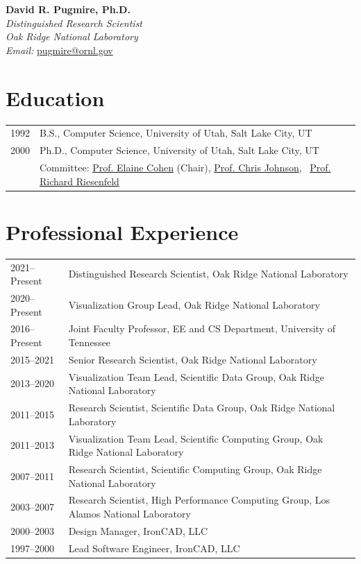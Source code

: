 \documentclass[11pt]{article}
\begin{document}
{\LARGE \textbf{David R. Pugmire, Ph.D.}}\\[0.5em]
\textit{Distinguished Research Scientist}\\
\textit{Oak Ridge National Laboratory}\\[0.5em]
\textit{Email:} \href{pugmire@ornl.gov}{pugmire@ornl.gov} \\
\vspace{1em}

\section*{Education}

\begin{tabular}{@{}p{2.5cm}p{11cm}@{}}
1992 & B.S., Computer Science, University of Utah, Salt Lake City, UT \\
2000 & Ph.D., Computer Science, University of Utah, Salt Lake City, UT \\
     & Committee: \href{https://profiles.faculty.utah.edu/u0028572}{Prof. Elaine Cohen} (Chair),
       \href{https://users.cs.utah.edu/~crj/}{Prof. Chris Johnson},%
       \ \href{https://users.cs.utah.edu/~rfr/}{Prof. Richard Riesenfeld} \\[0.5em]
\end{tabular}

\vspace{1em}

\section*{Professional Experience}

\begin{tabular}{@{}p{2.5cm}p{11cm}@{}}
2021--Present & Distinguished Research Scientist, Oak Ridge National Laboratory \\
2020--Present & Visualization Group Lead, Oak Ridge National Laboratory \\
2016--Present & Joint Faculty Professor, EE and CS Department, University of Tennessee \\
2015--2021    & Senior Research Scientist, Oak Ridge National Laboratory \\
2013--2020    & Visualization Team Lead, Scientific Data Group, Oak Ridge National Laboratory \\
2011--2015    & Research Scientist, Scientific Data Group, Oak Ridge National Laboratory \\
2011--2013    & Visualization Team Lead, Scientific Computing Group, Oak Ridge National Laboratory \\
2007--2011    & Research Scientist, Scientific Computing Group, Oak Ridge National Laboratory \\
2003--2007    & Research Scientist, High Performance Computing Group, Los Alamos National Laboratory \\
2000--2003    & Design Manager, IronCAD, LLC \\
1997--2000    & Lead Software Engineer, IronCAD, LLC \\
\end{tabular}
\end{document}
